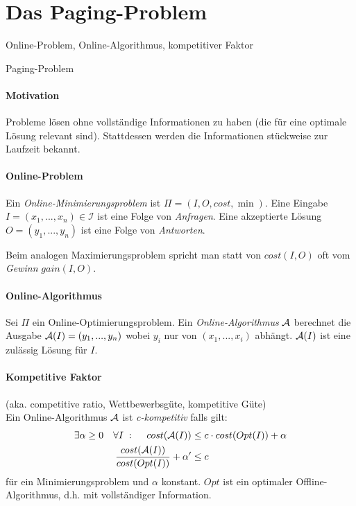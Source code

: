 \section{Das Paging-Problem}

\begin{takeaway}
    \item Online-Problem, Online-Algorithmus, kompetitiver Faktor
    \item Paging-Problem
\end{takeaway}

\paragraph{Motivation}
Probleme lösen ohne vollständige Informationen zu haben (die für eine optimale Lösung relevant sind).
Stattdessen werden die Informationen stückweise zur Laufzeit bekannt.

\paragraph{Online-Problem}
Ein \emph{Online-Minimierungsproblem} ist $\Pi = (I, O, cost, \min)$.
Eine Eingabe $I = (x_1, ..., x_n) \in \mathcal{I}$ ist eine Folge von \emph{Anfragen}.
Eine akzeptierte Lösung $O = (y_1, ..., y_n)$ ist eine Folge von \emph{Antworten}.

Beim analogen Maximierungsproblem spricht man statt von $cost(I, O)$ oft vom \emph{Gewinn} $gain(I,O)$.

\paragraph{Online-Algorithmus}
Sei $\Pi$ ein Online-Optimierungsproblem.
Ein \emph{Online-Algorithmus} $\mathcal{A}$ berechnet die Ausgabe $\mathcal{A}(I) = (y_1, ..., y_n) $
wobei $y_i$ nur von $(x_1, ..., x_i)$ abhängt.
$\mathcal{A}(I)$ ist eine zulässig Lösung für $I$.

\paragraph{Kompetitive Faktor}
(aka. competitive ratio, Wettbewerbsgüte, kompetitive Güte) \\
Ein Online-Algorithmus $\mathcal{A}$ ist \emph{c-kompetitiv} falls gilt:
\begin{align*}
\exists \alpha \geq 0 \quad \forall I \; : \; \quad cost(\mathcal{A}(I)) & \leq c \cdot cost(Opt(I)) + \alpha \\
\dfrac{cost(\mathcal{A}(I))}{cost(Opt(I))} + \alpha' & \leq c
\end{align*}
für ein Minimierungsproblem und $\alpha$ konstant.
$Opt$ ist ein optimaler Offline-Algorithmus, d.h. mit vollständiger Information.

